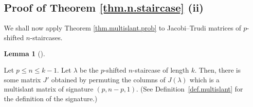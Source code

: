 \documentclass[numbers=enddot,12pt,final,onecolumn,notitlepage]{scrartcl}%
\theoremstyle{definition}
\newtheorem{lem}[theo]{Lemma}
\newenvironment{lemma}[1][]
{\begin{lem}[#1]\begin{leftbar}}
{\end{leftbar}\end{lem}}
\renewcommand{\leq}{\leqslant}
\theoremstyle{plainsl}
\begin{document}
\subsection{Proof of Theorem \ref{thm.n.staircase} (ii)}

We shall now apply Theorem \ref{thm.multislant.prob} to Jacobi--Trudi matrices of $p$-shifted $n$-staircases.

\begin{lemma}
\label{multistair}
Let $p \leq n \leq k-1$.
Let $\lambda$ be the $p$-shifted $n$-staircase of length $k$.
Then, there is some matrix $J'$ obtained by permuting the columns of $J(\lambda)$ which is a multislant matrix
of signature $(p, n-p, 1)$.
(See Definition~\ref{def.multislant} for the definition of the signature.)
\end{lemma}
\end{document}
